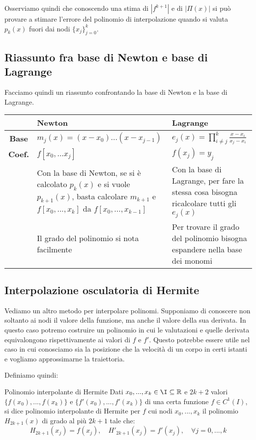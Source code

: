 \documentclass[a4paper,11pt]{article}
\begin{document}
Osserviamo quindi che conoscendo una stima di $|f^{k + 1}|$ e  di $|\Pi(x)|$ si può provare a stimare l'errore del polinomio di interpolazione quando si valuta $p_k(x)$ fuori dai nodi $\{ x_j \}_{j=0}^k$.

\subsection{Riassunto fra base di Newton e base di Lagrange}
Facciamo quindi un riassunto confrontando la base di Newton e la base di Lagrange.
\begin{table}[h!]
	\center 
	\begin{tabular} { c p{6cm} | p{6cm} }
		& \bfseries Newton & \bfseries Lagrange \\
		\hline
		\bfseries Base & $m_j(x) = (x - x_0) ... (x - x_{j - 1}) $ & $e_j(x) = \prod_{i \neq j}^k \frac{x - x_i}{x_j - x_i}$ \\
		\bfseries Coef. & $f[x_0, ... x_j]$ & $f(x_j) = y_j$ \\
		& Con la base di Newton, se si è calcolato $p_k(x)$ e si vuole $p_{k + 1}(x)$, basta calcolare $m_{k + 1}$ e $f[x_0, ..., x_{k}]$ da $f[x_0, ..., x_{k - 1}]$ &
		Con la base di Lagrange, per fare la stessa cosa bisogna ricalcolare tutti gli $e_j(x)$ \\
		& Il grado del polinomio si nota facilmente & Per trovare il grado del polinomio bisogna espandere nella base dei monomi
	\end{tabular}
\end{table}

\subsection{Interpolazione osculatoria di Hermite}
Vediamo un altro metodo per interpolare polinomi.
Supponiamo di conoscere non soltanto ai nodi il valore della funzione, ma anche il valore della sua derivata.
In questo caso potremo costruire un polinomio in cui le valutazioni e quelle derivata equivalongono rispettivamente ai valori di $f$ e $f'$.
Questo potrebbe essere utile nel caso in cui conosciamo sia la posizione che la velocità di un corpo in certi istanti e vogliamo approssimarne la traiettoria.

Definiamo quindi:
\begin{definition}{Polinomio interpolante di Hermite }
	Dati $x_0, ..., x_k \in \I \subseteq \mathbb{R}$ e $2k + 2$ valori $\{f(x_0), ..., f(x_k) \}$ e $\{ f'(x_0), ..., f'(x_k) \}$ di una certa funzione $f \in C^{1}(I)$, si dice polinomio interpolante di Hermite per $f$ cui nodi $x_0, ..., x_k$ il polinomio $H_{2k + 1}(x)$ di grado al più $2k + 1$ tale che:
	$$
		H_{2k + 1}(x_j) = f(x_j), \quad H'_{2k + 1}(x_j) = f'(x_j), \quad \forall j = 0, ..., k
	$$
\end{definition}
\end{document}
